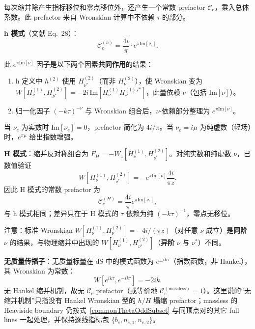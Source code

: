 ﻿\documentclass[a4paper,11pt]{article}
\begin{document}
每次缩并除产生指标移位和零点移位外，还产生一个常数 prefactor $\mathcal{C}_e$，乘入总体系数。此 prefactor 来自 Wronskian 计算中不依赖 $\tau$ 的部分。

\textbf{h 模式}（文献 Eq.~28）：
\begin{equation}
  \mathcal{C}_e^{(h)} = \frac{4i}{\pi} \cdot e^{\pi \text{Im}[\nu_e]}.
  \label{prefactorH}
\end{equation}

此 $e^{\pi\text{Im}[\nu]}$ 因子是以下两个因素\textbf{共同作用}的结果：
\begin{enumerate}
  \item h 定义中 $h^{(2)}$ 使用 $H_{\nu^*}^{(2)}$（而非 $H_\nu^{(2)}$），使 Wronskian 变为 $W[H_\nu^{(1)}, H_{\nu^*}^{(2)}] = -2i\,\text{Im}[H_\nu^{(1)} {H_\nu^{(1)}}'^*]$，此量依赖 $\nu$（包括 $\text{Im}[\nu]$）。
  \item 归一化因子 $(-k\tau)^{-\nu}$ 与 Wronskian 组合后，$\nu$-依赖部分整理为 $e^{\pi\text{Im}[\nu]}$。
\end{enumerate}

当 $\nu_e$ 为实数时 $\text{Im}[\nu_e] = 0$，prefactor 简化为 $4i/\pi$。当 $\nu_e = i\mu$ 为纯虚数（轻场）时，$e^{\pi\mu}$ 给出指数增强。

\textbf{H 模式}：缩并反对称组合为 $F_H=-W_z[H_\nu^{(1)},H_{\nu^*}^{(2)}]$。对纯实数和纯虚数 $\nu$，已数值验证
\begin{equation}
  W[H_\nu^{(1)}, H_{\nu^*}^{(2)}] = -e^{\pi\text{Im}[\nu]} \frac{4i}{\pi z}.
  \label{WcrossOrder}
\end{equation}
因此 H 模式的常数 prefactor 为
\begin{equation}
  \mathcal{C}_e^{(H)} = \frac{4i}{\pi} e^{\pi\text{Im}[\nu_e]},
\end{equation}
与 h 模式相同；差异只在于 H 模式的 $\tau$ 依赖为纯 $(-k\tau)^{-1}$，零点无移位。

注意：标准 Wronskian $W[H_\nu^{(1)}, H_\nu^{(2)}] = -4i/(\pi z)$（对任意 $\nu$ 成立）是\textbf{同阶} $\nu$ 的结果，与物理缩并中出现的 $W[H_\nu^{(1)}, H_{\nu^*}^{(2)}]$（\textbf{异阶} $\nu$ 与 $\nu^*$）不同。

\textbf{无质量传播子}：无质量标量在 dS 中的模式函数为 $e^{\pm ik\tau}$（指数函数，非 Hankel），其 Wronskian 为常数：
\begin{equation}
  W[e^{ik\tau}, e^{-ik\tau}] = -2ik.
\end{equation}
无 Hankel 缩并机制，故无 $\mathcal{C}_e$ prefactor（或等价地 $\mathcal{C}_e^{(\text{massless})} = 1$）。这里说的“无缩并机制”只指没有 Hankel Wronskian 型的 $h/H$ 塌缩 prefactor；massless 的 Heaviside boundary 仍按式~\eqref{commonThetaOddSubset} 与同顶点对的其它 full lines 一起处理，并保持逐线指标包 $\{b_e,n_{e,1},n_{e,2}\}$。
\end{document}
